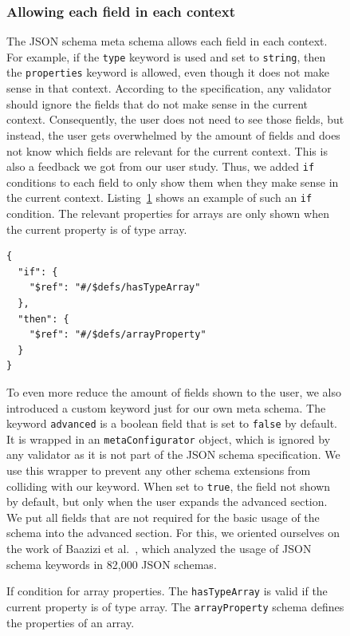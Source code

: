 \begin{figure}[h]
\subsubsection{Allowing each field in each context}
The JSON schema meta schema allows each field in each context.
For example, if the \texttt{type} keyword is used and set to \texttt{string}, then the \texttt{properties} keyword is allowed,
even though it does not make sense in that context.
According to the specification, any validator should ignore the fields that do not make sense in the current context.
Consequently, the user does not need to see those fields, but instead, the user gets overwhelmed by the amount of fields
and does not know which fields are relevant for the current context.
This is also a feedback we got from our user study.
Thus, we added \texttt{if} conditions to each field to only show them when they make sense in the current context.
Listing~\ref{lst:if-then-else} shows an example of such an \texttt{if} condition.
The relevant properties for arrays are only shown when the current property is of type array.

\begin{listing}[!h]
    \begin{verbatim}
{
  "if": {
    "$ref": "#/$defs/hasTypeArray"
  },
  "then": {
    "$ref": "#/$defs/arrayProperty"
  }
}
    \end{verbatim}
    \caption{If condition for array properties. The \texttt{hasTypeArray} is valid if the current property is of type array. The \texttt{arrayProperty} schema defines the properties of an array.}
    \label{lst:if-then-else}
\end{listing}

To even more reduce the amount of fields shown to the user, we also introduced a custom keyword just for our own meta schema.
The keyword \texttt{advanced} is a boolean field that is set to \texttt{false} by default.
It is wrapped in an \texttt{metaConfigurator} object, which is ignored by any validator as it is not part of the JSON schema specification.
We use this wrapper to prevent any other schema extensions from colliding with our keyword.
When set to \texttt{true}, the field not shown by default, but only when the user expands the advanced section.
We put all fields that are not required for the basic usage of the schema into the advanced section.
For this, we oriented ourselves on the work of Baazizi et al.~\cite{baazizi2021empirical}, which analyzed the usage of JSON schema keywords in 82,000 JSON schemas.


\end{figure}
